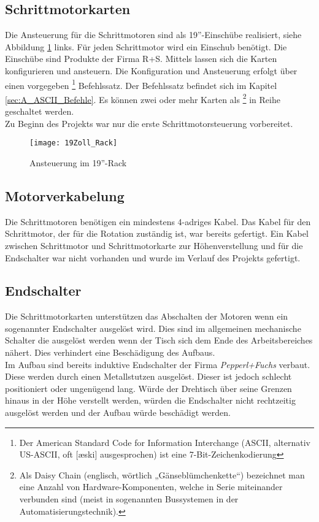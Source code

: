 \subsection{Schrittmotorkarten}
\label{sec:Schrittmotorkarten}
Die Ansteuerung für die Schrittmotoren sind als 19''-Einschübe realisiert, siehe Abbildung \ref{fig:19Zoll_Rack} links. Für jeden Schrittmotor wird ein Einschub benötigt.
Die Einschübe sind Produkte der Firma R+S. Mittels  lassen sich die Karten konfigurieren und ansteuern. Die Konfiguration und Ansteuerung erfolgt über einen vorgegeben 
\footnote{Der American Standard Code for Information Interchange (ASCII, alternativ US-ASCII, oft [æski] ausgesprochen) ist eine 7-Bit-Zeichenkodierung\cite{wiki:ASCII}}
 Befehlssatz. Der Befehlssatz befindet sich im Kapitel \ref{sec:A_ASCII_Befehle}. Es können zwei oder mehr Karten als 
\footnote{Als Daisy Chain (englisch, wörtlich „Gänseblümchenkette“) bezeichnet man eine Anzahl von Hardware-Komponenten, welche in Serie miteinander verbunden sind (meist in sogenannten Bussystemen in der Automatisierungstechnik).\cite{wiki:Daisy} } in Reihe geschaltet werden.\\
Zu Beginn des Projekts war nur die erste Schrittmotorsteuerung vorbereitet.
\begin{figure}[h]
\centering
\texttt{[image: 19Zoll\_Rack]}
\caption{Ansteuerung im 19''-Rack}
\label{fig:19Zoll_Rack}
\end{figure}
\subsection{Motorverkabelung}
\label{sec:Motorverkabelung}
Die Schrittmotoren benötigen ein mindestens 4-adriges Kabel. Das Kabel für den Schrittmotor, der für die Rotation zuständig ist, war bereits gefertigt. Ein Kabel zwischen Schrittmotor und Schrittmotorkarte zur Höhenverstellung und für die Endschalter war nicht vorhanden und wurde im Verlauf des Projekts gefertigt. 

\subsection{Endschalter}
\label{sec:Endschalter}
Die Schrittmotorkarten unterstützen das Abschalten der Motoren wenn ein sogenannter Endschalter ausgelöst wird. Dies sind im allgemeinen mechanische Schalter die ausgelöst werden wenn der Tisch sich dem Ende des Arbeitsbereiches nähert. Dies verhindert eine Beschädigung des Aufbaus.\\
Im Aufbau sind bereits induktive Endschalter der Firma \textit{Pepperl+Fuchs} verbaut. Diese werden durch einen Metallstutzen ausgelöst. Dieser ist jedoch schlecht positioniert oder ungenügend lang. Würde der Drehtisch über seine Grenzen hinaus in der Höhe verstellt werden, würden die Endschalter nicht rechtzeitig ausgelöst werden und der Aufbau würde beschädigt werden.


